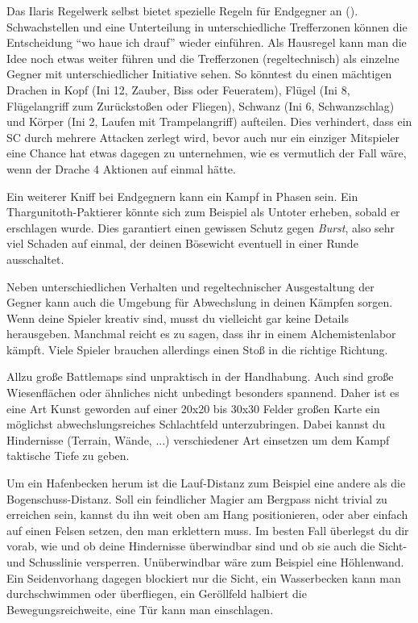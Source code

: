 Das Ilaris Regelwerk selbst bietet spezielle Regeln für Endgegner an (). Schwachstellen und eine Unterteilung in unterschiedliche Trefferzonen können die Entscheidung \enquote{wo haue ich drauf} wieder einführen.
Als Hausregel kann man die Idee noch etwas weiter führen und die Trefferzonen (regeltechnisch) als einzelne Gegner mit unterschiedlicher Initiative sehen.
So könntest du einen mächtigen Drachen in Kopf (Ini 12, Zauber, Biss oder Feueratem), Flügel (Ini 8, Flügelangriff zum Zurückstoßen oder Fliegen), Schwanz (Ini 6, Schwanzschlag) und Körper (Ini 2, Laufen mit Trampelangriff) aufteilen.
Dies verhindert, dass ein SC durch mehrere Attacken zerlegt wird, bevor auch nur ein einziger Mitspieler eine Chance hat etwas dagegen zu unternehmen, wie es vermutlich der Fall wäre, wenn der Drache 4 Aktionen auf einmal hätte.



Ein weiterer Kniff bei Endgegnern kann ein Kampf in Phasen sein.
Ein Thargunitoth-Paktierer könnte sich zum Beispiel als Untoter erheben, sobald er erschlagen wurde.
Dies garantiert einen gewissen Schutz gegen \textit{Burst}, also sehr viel Schaden auf einmal, der deinen Bösewicht eventuell in einer Runde ausschaltet.


Neben unterschiedlichen Verhalten und regeltechnischer Ausgestaltung der Gegner kann auch die Umgebung für Abwechslung in deinen Kämpfen sorgen.
Wenn deine Spieler kreativ sind, musst du vielleicht gar keine Details herausgeben.
Manchmal reicht es zu sagen, dass ihr in einem Alchemistenlabor kämpft.
Viele Spieler brauchen allerdings einen Stoß in die richtige Richtung. 

Allzu große Battlemaps sind unpraktisch in der Handhabung.
Auch sind große Wiesenflächen oder ähnliches nicht unbedingt besonders spannend.
Daher ist es eine Art Kunst geworden auf einer 20x20 bis 30x30 Felder großen Karte ein möglichst abwechslungsreiches Schlachtfeld unterzubringen. Dabei kannst du Hindernisse (Terrain, Wände, ...) verschiedener Art einsetzen um dem Kampf taktische Tiefe zu geben. 

Um ein Hafenbecken herum ist die Lauf-Distanz zum Beispiel eine andere als die Bogenschuss-Distanz.
Soll ein feindlicher Magier am Bergpass nicht trivial zu erreichen sein, kannst du ihn weit oben am Hang positionieren, oder aber einfach auf einen Felsen setzen, den man erklettern muss.
Im besten Fall überlegst du dir vorab, wie und ob deine Hindernisse überwindbar sind und ob sie auch die Sicht- und Schusslinie versperren.
Unüberwindbar wäre zum Beispiel eine Höhlenwand. Ein Seidenvorhang dagegen blockiert nur die Sicht, ein Wasserbecken kann man durchschwimmen oder überfliegen, ein Geröllfeld halbiert die Bewegungsreichweite, eine Tür kann man einschlagen.

